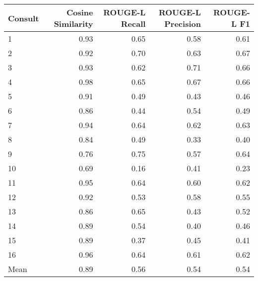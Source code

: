 \begin{tabular}{lrrrr}
\toprule
Consult & Cosine Similarity & ROUGE-L Recall & ROUGE-L Precision & ROUGE-L F1 \\
\midrule
1 & 0.93 & 0.65 & 0.58 & 0.61 \\
2 & 0.92 & 0.70 & 0.63 & 0.67 \\
3 & 0.93 & 0.62 & 0.71 & 0.66 \\
4 & 0.98 & 0.65 & 0.67 & 0.66 \\
5 & 0.91 & 0.49 & 0.43 & 0.46 \\
6 & 0.86 & 0.44 & 0.54 & 0.49 \\
7 & 0.94 & 0.64 & 0.62 & 0.63 \\
8 & 0.84 & 0.49 & 0.33 & 0.40 \\
9 & 0.76 & 0.75 & 0.57 & 0.64 \\
10 & 0.69 & 0.16 & 0.41 & 0.23 \\
11 & 0.95 & 0.64 & 0.60 & 0.62 \\
12 & 0.92 & 0.53 & 0.58 & 0.55 \\
13 & 0.86 & 0.65 & 0.43 & 0.52 \\
14 & 0.89 & 0.54 & 0.40 & 0.46 \\
15 & 0.89 & 0.37 & 0.45 & 0.41 \\
16 & 0.96 & 0.64 & 0.61 & 0.62 \\
Mean & 0.89 & 0.56 & 0.54 & 0.54 \\
\bottomrule
\end{tabular}
